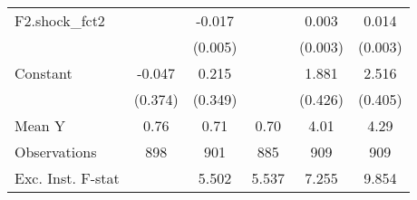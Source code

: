 {\begin{tabular}{l*{5}{c}}
\addlinespace
F2.shock\_fct2       &                     &      -0.017\sym{***}&                     &       0.003         &       0.014\sym{***}\\
                    &                     &     (0.005)         &                     &     (0.003)         &     (0.003)         \\
\addlinespace
Constant            &      -0.047         &       0.215         &                     &       1.881\sym{***}&       2.516\sym{***}\\
                    &     (0.374)         &     (0.349)         &                     &     (0.426)         &     (0.405)         \\
\midrule
Mean Y              &        0.76         &        0.71         &        0.70         &        4.01         &        4.29         \\
Observations        &         898         &         901         &         885         &         909         &         909         \\
Exc. Inst. F-stat   &                     &       5.502         &       5.537         &       7.255         &       9.854         \\
\bottomrule
\end{tabular}
}
